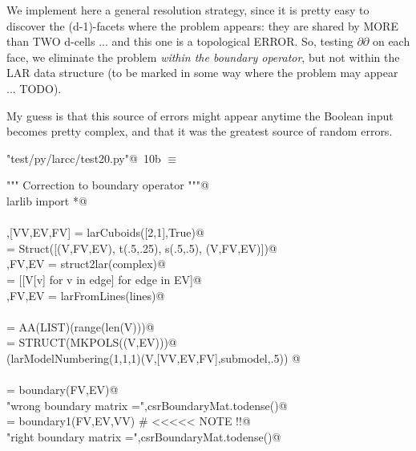 \documentclass[11pt,oneside]{article}	%
\begin{document}
We implement here a general resolution strategy, since it is pretty  easy to discover the (d-1)-facets where the problem appears:  they are shared by MORE than TWO d-cells ... and this one is a topological ERROR. So, testing $\partial\partial$ on each face, we eliminate the problem \emph{within the boundary operator}, but not within the LAR data structure (to be marked in some way where the problem may appear ... TODO).

My guess is that this source of errors might appear anytime the Boolean input becomes pretty complex, and that it was the greatest source of random errors. 

\begin{flushleft} \small \label{scrap18}
\protect{}\verb@"test/py/larcc/test20.py"@\nobreak\ {\footnotesize 10b }$\equiv$
\vspace{-1ex}
\begin{list}{}{} \item
\mbox{}\verb@""" Correction to boundary operator """@\\
\mbox{}\verb@from larlib import *@\\
\mbox{}\verb@@\\
\mbox{}\verb@V,[VV,EV,FV] = larCuboids([2,1],True)@\\
\mbox{}\verb@complex = Struct([(V,FV,EV), t(.5,.25), s(.5,.5), (V,FV,EV)])@\\
\mbox{}\verb@V,FV,EV = struct2lar(complex)@\\
\mbox{}\verb@lines = [[V[v] for v in edge] for edge in EV]@\\
\mbox{}\verb@V,FV,EV = larFromLines(lines)@\\
\mbox{}\verb@@\\
\mbox{}\verb@VV = AA(LIST)(range(len(V)))@\\
\mbox{}\verb@submodel = STRUCT(MKPOLS((V,EV)))@\\
\mbox{}\verb@VIEW(larModelNumbering(1,1,1)(V,[VV,EV,FV],submodel,.5)) @\\
\mbox{}\verb@@\\
\mbox{}\verb@csrBoundaryMat = boundary(FV,EV)@\\
\mbox{}\verb@print "wrong boundary matrix =",csrBoundaryMat.todense()@\\
\mbox{}\verb@csrBoundaryMat = boundary1(FV,EV,VV)  # <<<<< NOTE !!@\\
\mbox{}\verb@print "right boundary matrix =",csrBoundaryMat.todense()@\\

\end{list}
\end{flushleft}
\end{document}
